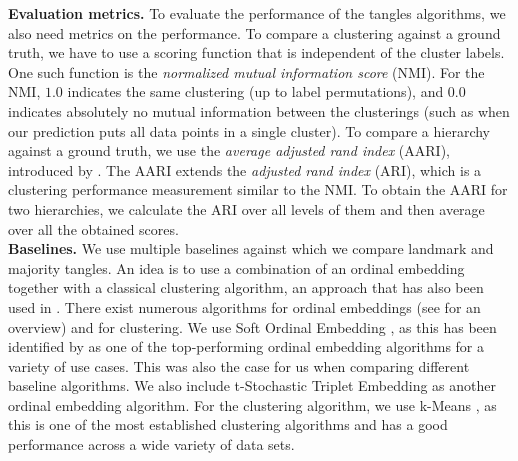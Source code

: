 \noindent
\textbf{Evaluation metrics.}
To evaluate the performance of the tangles algorithms, we also need metrics on the performance.
To compare a clustering against a ground truth, we have to use a scoring function that is independent of the cluster labels. 
One such function is the \textit{normalized mutual information score} (NMI). 
For the NMI, $1.0$ indicates the same clustering (up to label permutations), and $0.0$ indicates absolutely no mutual information between the clusterings (such as when our prediction
puts all data points in a single cluster). To compare a hierarchy against a ground truth, we use the \textit{average adjusted rand index} (AARI), 
introduced by \cite{ghoshdastidarFoundationsComparisonBasedHierarchical2019}. The AARI extends the \textit{adjusted rand index} (ARI), which is a clustering performance measurement
similar to the NMI. To obtain the AARI for two hierarchies, we calculate the ARI over all levels of them and then average over all the obtained scores. 
\\

\noindent
\textbf{Baselines.}
We use multiple baselines against which we compare landmark and majority tangles.
An idea is to use a combination of an ordinal embedding together with a classical clustering algorithm, an approach that has also been used in \cite{kleindessnerLensDepthFunction2017}. 
There exist numerous algorithms for ordinal embeddings (see \cite{vankadaraInsightsOrdinalEmbedding2021} for an overview) and for clustering.  
We use Soft Ordinal Embedding \citep[SOE,][]{teradaLocalOrdinalEmbedding2014}, as this has been identified by \cite{vankadaraInsightsOrdinalEmbedding2021} as one of the 
top-performing ordinal embedding algorithms for a variety of use cases. This was also the case for us when comparing different baseline algorithms.
We also include t-Stochastic Triplet Embedding \citep[t-STE,][]{ laurensvandermaatenStochasticTripletEmbedding2012} as another ordinal embedding algorithm. 
For the clustering algorithm, we use k-Means \citep{lloydLeastSquaresQuantization1982}, as this is one of the most established clustering algorithms 
and has a good performance across a wide variety of data sets.


